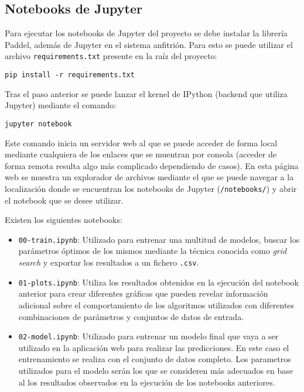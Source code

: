 \subsection{Notebooks de Jupyter}

Para ejecutar los notebooks de Jupyter del proyecto se debe instalar la librería
Paddel, además de Jupyter en el sistema anfitrión. Para esto se puede utilizar
el archivo \texttt{requirements.txt} presente en la raíz del proyecto:

\texttt{pip install -r requirements.txt}

Tras el paso anterior se puede lanzar el kernel de IPython (backend que utiliza
Jupyter) mediante el comando:

\texttt{jupyter notebook}

Este comando inicia un servidor web al que se puede acceder de forma local
mediante cualquiera de los enlaces que se muentran por consola (acceder de forma
remota resulta algo más complicado dependiendo de casos). En esta página web se
muestra un explorador de archivos mediante el que se puede navegar a la
localización donde se encuentran los notebooks de Jupyter (\texttt{/notebooks/})
y abrir el notebook que se desee utilizar.

Existen los siguientes notebooks:

\begin{itemize}
    \item \texttt{00-train.ipynb}: Utilizado para entrenar una multitud de
    modelos, buscar los parámetros óptimos de los mismos mediante la técnica
    conocida como \textit{grid search} y exportar los resultados a un fichero
    \texttt{.csv}.
    \item \texttt{01-plots.ipynb}: Utiliza los resultados obtenidos en la
    ejecución del notebook anterior para crear diferentes gráficas que pueden
    revelar información adicional sobre el comportamiento de los algoritmos
    utilizados con diferentes combinaciones de parámetros y conjuntos de datos
    de entrada.
    \item \texttt{02-model.ipynb}: Utilizado para entrenar un modelo final que
    vaya a ser utilizado en la aplicación web para realizar las predicciones. En
    este caso el entrenamiento se realiza con el conjunto de datos completo. Los
    parametros utilizados para el modelo serán los que se consideren más
    adecuados en base al los resultados observados en la ejecución de los
    notebooks anteriores.
\end{itemize}

